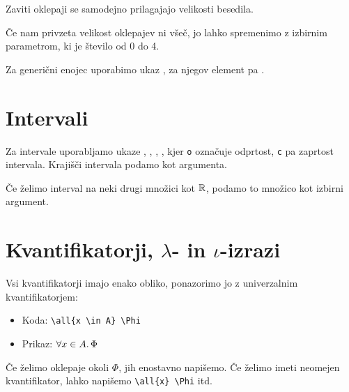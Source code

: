 Zaviti oklepaji se samodejno prilagajajo velikosti besedila.

Če nam privzeta velikost oklepajev ni všeč, jo lahko spremenimo z izbirnim parametrom, ki je število od 0 do 4.

Za generični enojec uporabimo ukaz , za njegov element pa .

\section*{Intervali}


Za intervale uporabljamo ukaze , , , , kjer \texttt{o} označuje odprtost, \texttt{c} pa zaprtost intervala. Krajišči intervala podamo kot argumenta.

Če želimo interval na neki drugi množici kot $\mathbb{R}$, podamo to množico kot izbirni argument.

\section*{Kvantifikatorji, $\lambda$- in $\iota$-izrazi}

Vsi kvantifikatorji imajo enako obliko, ponazorimo jo z univerzalnim kvantifikatorjem:
%
%
\begin{itemize}
\item Koda: \verb|\all{x \in A} \Phi|
\item Prikaz: $\forall x \in A .\, \Phi$
\end{itemize}
%
Če želimo oklepaje okoli $\Phi$, jih enostavno napišemo. Če želimo imeti neomejen kvantifikator, lahko napišemo \verb|\all{x} \Phi| itd.

